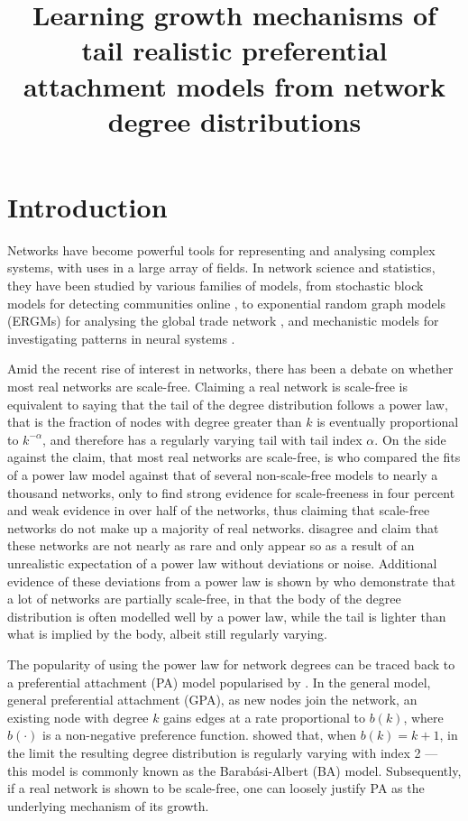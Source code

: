 \documentclass[
  sn-basic,
  10pt,
]{sn-jnl}
\title[Learning growth mechanisms of tail realistic preferential
attachment models from network degree distributions]{Learning growth
mechanisms of tail realistic preferential attachment models from network
degree distributions}
\author*[1]{\fnm{Thomas William} \sur{Boughen}}\email{t.w.boughen1@newcastle.ac.uk}\author[1]{\fnm{Clement} \sur{Lee}}\author[1]{\fnm{Vianey Palacios} \sur{Ramirez}}
\affil[1]{\orgdiv{School of Mathematics, Statistics and
Physics}, \orgname{Newcastle University}}
\theoremstyle{plain}
\theoremstyle{plain}
\theoremstyle{remark}
\begin{document}
\maketitle


\newpage

\section{Introduction}\label{introduction}

Networks have become powerful tools for representing and analysing
complex systems, with uses in a large array of fields. In network
science and statistics, they have been studied by various families of
models, from stochastic block models for detecting communities online
\citep{Latouche11}, to exponential random graph models (ERGMs) for
analysing the global trade network \citep{Setayesh22}, and mechanistic
models for investigating patterns in neural systems \citep{Betzel17}.

Amid the recent rise of interest in networks, there has been a debate on
whether most real networks are scale-free. Claiming a real network is
scale-free is equivalent to saying that the tail of the degree
distribution follows a power law, that is the fraction of nodes with
degree greater than \(k\) is eventually proportional to \(k^{-\alpha}\),
and therefore has a regularly varying tail with tail index \(\alpha\).
On the side against the claim, that most real networks are scale-free,
is \citet{Broido_2019} who compared the fits of a power law model
against that of several non-scale-free models to nearly a thousand
networks, only to find strong evidence for scale-freeness in four
percent and weak evidence in over half of the networks, thus claiming
that scale-free networks do not make up a majority of real networks.
\citet{Voitalov_2019} disagree and claim that these networks are not
nearly as rare and only appear so as a result of an unrealistic
expectation of a power law without deviations or noise. Additional
evidence of these deviations from a power law is shown by \citet{Lee24}
who demonstrate that a lot of networks are partially scale-free, in that
the body of the degree distribution is often modelled well by a power
law, while the tail is lighter than what is implied by the body, albeit
still regularly varying.

The popularity of using the power law for network degrees can be traced back to a preferential attachment (PA) model popularised by \cite{Barabasi99}. In the general model, general preferential attachment (GPA), as new nodes join the network, an existing node with degree $k$ gains edges at a rate proportional to $b(k)$, where $b(\cdot)$ is a non-negative preference function. \cite{Barabasi99} showed that, when $b(k) = k + 1$, in the limit the resulting degree distribution is regularly varying with index 2 --- this model is commonly known as the Barab\'asi-Albert (BA) model.  Subsequently, if a real network is shown to be scale-free, one can loosely justify PA as the underlying mechanism of its growth.
\end{document}
